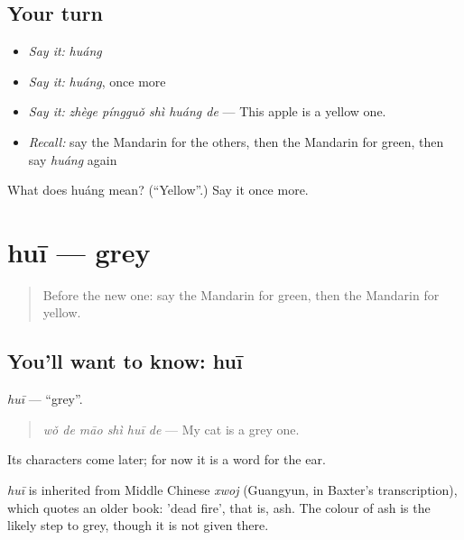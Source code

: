 \subsection*{Your turn}
\begin{itemize}
\raggedright
  \item \emph{Say it:} \emph{huáng}
  \item \emph{Say it:} \emph{huáng}, once more
  \item \emph{Say it:} \emph{zhège píngguǒ shì huáng de} — This apple is a yellow one.
  \item \emph{Recall:} say the Mandarin for the others, then the Mandarin for green, then say \emph{huáng} again
\end{itemize}

\begin{tcolorbox}[breakable,colback=teal!4,colframe=teal!35!black,title={Before you move on}]
What does huáng mean? (\textquotedblleft{}Yellow\textquotedblright{}.) Say it once more.
\end{tcolorbox}
\section[huī]{huī — grey}

\label{lesson:ZH-C139-hui}



\begin{quote}
Before the new one: say the Mandarin for green, then the Mandarin for yellow.
\end{quote}

\subsection*{You'll want to know: huī}
\emph{huī} — \textquotedblleft{}grey\textquotedblright{}.

\begin{quote}
\emph{wǒ de māo shì huī de} — My cat is a grey one.
\end{quote}

Its characters come later; for now it is a word for the ear.

\begin{cousinweb}
\emph{huī} is inherited from Middle Chinese \emph{xwoj} (Guangyun, in Baxter's transcription), which quotes an older book: 'dead fire', that is, ash. The colour of ash is the likely step to grey, though it is not given there.
\end{cousinweb}

